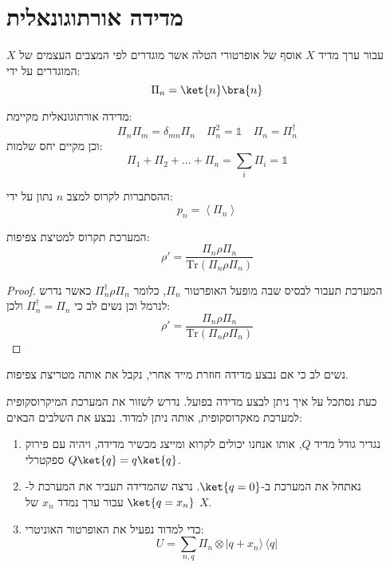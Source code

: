 \documentclass{tstextbook}
\begin{document}
\section{מדידה אורתוגונאלית}

\begin{definition}
עבור ערך מדיד \(X\) אוסף של אופרטורי הטלה אשר מוגדרים לפי המצבים העצמים של \(X\) המוגדרים על ידי:
$$\Pi_{n}=\ket{n} \bra{n} $$

\end{definition}
\begin{proposition}
מדידה אורתוגונאלית מקיימת:
$$\Pi_{n}\Pi_{m}=\delta_{mn}\Pi_{n}\quad \Pi_{n}^{2}=\mathbb{1} \quad \Pi_{n}=\Pi_{n}^{\dagger}$$
וכן מקיים יחס שלמות:
$$\Pi_{1}+\Pi_{2}+\dots+\Pi_{n}=\sum_{i}\Pi_{i}=\mathbb{1} $$

\end{proposition}
\begin{proposition}
ההסתברות לקרוס למצב \(n\) נתון על ידי:
$$p_{n}=\left\langle  \Pi_{n}  \right\rangle $$

\end{proposition}
\begin{proposition}
המערכת תקרוס למטיצת צפיפות:
$$\rho'= \frac{\Pi_{n}\rho \Pi_{n}}{\mathrm{Tr}\left( \Pi_{n}\rho \Pi_{n} \right)}$$

\end{proposition}
\begin{proof}
המערכת תעבור לבסיס שבה מופעל האופרטור \(\Pi_{n}\), כלומר \(\Pi_{n}^{\dagger}\rho \Pi_{n}\) כאשר נדרש לנרמל וכן נשים לב כי \(\Pi ^{\dagger}_{n}=\Pi_{n}\) ולכן:
$$\rho'= \frac{\Pi_{n}\rho \Pi_{n}}{\mathrm{Tr}\left( \Pi_{n}\rho \Pi_{n} \right)}$$

\end{proof}
\begin{remark}
נשים לב כי אם נבצע מדידה חוזרת מייד אחרי, נקבל את אותה מטריצת צפיפות.

\end{remark}
\begin{proposition}
כעת נסתכל על איך ניתן לבצע מדידה בפועל. נדרש לשזור את המערכת המיקרוסקופית למערכת מאקרוסקופית, אותה ניתן למדוד. נבצע את השלבים הבאים:

  \begin{enumerate}
    \item נגדיר גודל מדיד \(Q\), אותו אנחנו יכולים לקרוא ומייצג מכשיר מדידה, ויהיה עם פירוק ספקטרלי \(Q\ket{q}=q\ket{q}\). 


    \item נאתחל את המערכת ב-\(\ket{q=0}\). נרצה שהמדידה תעביר את המערכת ל-\(\ket{q=x_{n}}\) עבור ערך נמדד \(x_{n}\) של \(X\). 


    \item כדי למדוד נפעיל את האופרטור האוניטרי: 
$$U=\sum_{n,q}\Pi_{n}\otimes|q+x_{n}\rangle\,\langle q|$$


  \end{enumerate}
\end{proposition}
\end{document}
